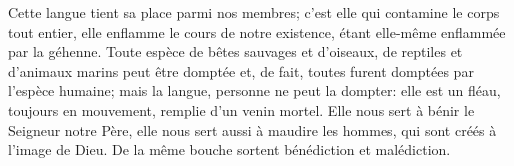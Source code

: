 Cette langue tient sa place parmi nos membres;
	c’est elle qui contamine le corps tout entier,
	elle enflamme le cours de notre existence,
	étant elle-même enflammée par la géhenne.
Toute espèce de bêtes sauvages et d’oiseaux,
		de reptiles et d’animaux marins peut être domptée
	et, de fait, toutes furent domptées par l’espèce humaine;
	mais la langue, personne ne peut la dompter:
	elle est un fléau, toujours en mouvement, remplie d’un venin mortel.
Elle nous sert à bénir le Seigneur notre Père,
	elle nous sert aussi à maudire les hommes, qui sont créés à l’image de Dieu.
De la même bouche sortent bénédiction et malédiction.
